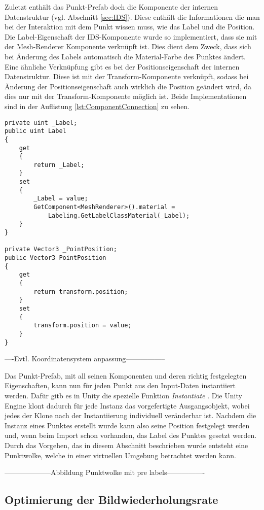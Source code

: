 Zuletzt enthält das Punkt-Prefab doch die Komponente der internen Datenstruktur (vgl. Abschnitt \ref{sec:IDS}). Diese enthält die Informationen die man bei der Interaktion mit dem Punkt wissen muss, wie das Label und die Position. Die Label-Eigenschaft der IDS-Komponente wurde so implementiert, dass sie mit der Mesh-Renderer Komponente verknüpft ist. Dies dient dem Zweck, dass sich bei Änderung des Labels automatisch die Material-Farbe des Punktes ändert. Eine ähnliche Verknüpfung gibt es bei der Positionseigenschaft der internen Datenstruktur. Diese ist mit der Transform-Komponente verknüpft, sodass bei Änderung der Positionseigenschaft auch wirklich die Position geändert wird, da dies nur mit der Transform-Komponente möglich ist. Beide Implementationen sind in der Auflistung \ref{lst:ComponentConnection} zu sehen.

\begin{lstlisting}[caption={Verknupfung von Label- und Positionseigenschaft der IDS-Komponente mit anderen Komponenten}, captionpos=t, label=lst:ComponentConnection]
private uint _Label;
public uint Label
{
    get
    {
        return _Label;
    }
    set
    {
        _Label = value;
        GetComponent<MeshRenderer>().material = 
        	Labeling.GetLabelClassMaterial(_Label);
    }
}

private Vector3 _PointPosition;
public Vector3 PointPosition
{
    get
    {
        return transform.position;
    }
    set
    {
        transform.position = value;
    }
}
\end{lstlisting}
\quad

----Evtl. Koordinatensystem anpassung-----------------

Das Punkt-Prefab, mit all seinen Komponenten und deren richtig festgelegten Eigenschaften, kann nun für jeden Punkt aus den Input-Daten instantiiert werden. Dafür gitb es in Unity die spezielle Funktion \textit{Instantiate} \cite{bib:Instantiate}. Die Unity Engine klont dadurch für jede Instanz das vorgefertigte Ausgangsobjekt, wobei jedes der Klone nach der Instantiierung individuell veränderbar ist. Nachdem die Instanz eines Punktes erstellt wurde kann also seine Position festgelegt werden und, wenn beim Import schon vorhanden, das Label des Punktes gesetzt werden. Durch das Vorgehen, das in diesem Abschnitt beschrieben wurde entsteht eine Punktwolke, welche in einer virtuellen Umgebung betrachtet werden kann. 

--------------------Abbildung Punktwolke mit pre labels----------------


\subsection{Optimierung der Bildwiederholungsrate}
\label{sec:Optimierung}

